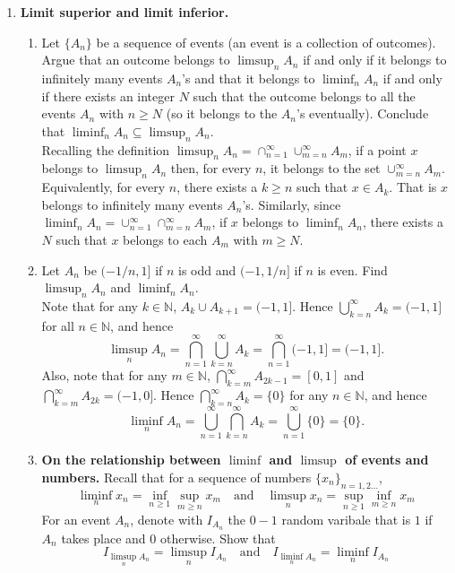 \documentclass[12pt]{article}
\begin{document}
\begin{enumerate}
\item {\bf Limit superior and limit inferior.}
\begin{enumerate}
\item Let $\{A_n\}$ be a sequence of events (an event is a collection of outcomes). Argue that an outcome belongs to $\limsup_n A_n$ if and only if it belongs to infinitely many events $A_n$'s and that it belongs to $\liminf_n A_n$ if and only if there exists an integer $N$ such that the outcome belongs to all the events $A_n$ with $n \geq N$ (so it belongs to the $A_n$'s eventually). Conclude that $\liminf_n A_n \subseteq \limsup_n A_n$.\\
\color{blue}
Recalling the definition $\limsup_n A_n = \cap_{n=1}^\infty \cup_{m=n}^\infty A_m$, if a point $x$ belongs to $\limsup_n A_n$ then, for every $n$, it belongs to the set $\cup_{m=n}^\infty A_m$. Equivalently, for every $n$, there exists a $k \geq n$ such that $x \in A_k$. That is $x$ belongs to infinitely many events $A_n$'s. Similarly, since $\liminf_n A_n = \cup_{n=1}^\infty \cap_{m=n}^\infty A_m$, if $x$ belongs to $\liminf_n A_n$, there exists a $N$ such that $x$ belongs to each $A_m$ with $m \geq N$.
\color{black}
\color{black}
\item Let $A_n$ be $(-1/n,1]$ if $n$ is odd and $(-1,1/n]$ if $n$ is even. Find $\limsup_n A_n$ and $\liminf_n A_n$.\\
\color{blue} 
Note that for any $k\in\mathbb{N}$, $A_{k}\cup A_{k+1}=(-1,1]$.
Hence $\bigcup_{k=n}^{\infty}A_{k}=(-1,1]$ for all $n\in\mathbb{N}$,
and hence 
\[
\limsup_{n}A_{n}=\bigcap_{n=1}^{\infty}\bigcup_{k=n}^{\infty}A_{k}=\bigcap_{n=1}^{\infty}(-1,1]=(-1,1].
\]
Also, note that for any $m\in\mathbb{N}$, $\bigcap_{k=m}^{\infty}A_{2k-1}=[0,1]$
and $\bigcap_{k=m}^{\infty}A_{2k}=(-1,0]$. Hence $\bigcap_{k=n}^{\infty}A_{k}=\{0\}$
for any $n\in\mathbb{N}$, and hence 
\[
\liminf_{n}A_{n}=\bigcup_{n=1}^{\infty}\bigcap_{k=n}^{\infty}A_{k}=\bigcup_{n=1}^{\infty}\{0\}=\{0\}.
\]
\color{black}

\item {\bf On the relationship between $\liminf$ and $\limsup$ of events and numbers.} Recall that for a sequence of numbers $\{ x_n\}_{n=1,2\ldots}$,
\[
\liminf_n x_n = \inf_{n \geq 1} \sup_{m \geq n} x_m \quad \text{and} \quad \limsup_n x_n = \sup_{n \geq 1} \inf_{m \geq n} x_m
\]
For an event $A_n$, denote with $I_{A_n}$ the $0-1$ random varibale that is $1$ if $A_n$ takes place and $0$ otherwise. Show that
\[
I_{\limsup_n A_n} = \limsup_n I_{A_n} \quad \text{and} \quad I_{\liminf_n A_n} = \liminf_n I_{A_n}
\]



\end{enumerate}
\end{enumerate}
\end{document}
